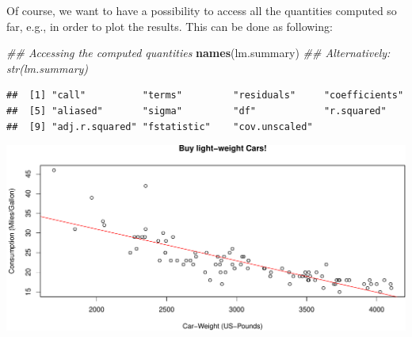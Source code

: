 \documentclass[]{book}
\newenvironment{Shaded}{\begin{snugshade}}{\end{snugshade}}
\newcommand{\CommentTok}[1]{\textcolor[rgb]{0.56,0.35,0.01}{\textit{#1}}}
\newcommand{\DataTypeTok}[1]{\textcolor[rgb]{0.13,0.29,0.53}{#1}}
\newcommand{\DecValTok}[1]{\textcolor[rgb]{0.00,0.00,0.81}{#1}}
\newcommand{\KeywordTok}[1]{\textcolor[rgb]{0.13,0.29,0.53}{\textbf{#1}}}
\newcommand{\NormalTok}[1]{#1}
\newcommand{\OperatorTok}[1]{\textcolor[rgb]{0.81,0.36,0.00}{\textbf{#1}}}
\newcommand{\StringTok}[1]{\textcolor[rgb]{0.31,0.60,0.02}{#1}}
\theoremstyle{definition}
\theoremstyle{definition}
\theoremstyle{definition}
\theoremstyle{remark}
\begin{document}
Of course, we want to have a possibility to access all the quantities computed so far, e.g., in order to plot the results. This can be done as following:

\begin{Shaded}
\begin{Highlighting}[]
\CommentTok{## Accessing the computed quantities}
\KeywordTok{names}\NormalTok{(lm.summary) }\CommentTok{## Alternatively: str(lm.summary)}
\end{Highlighting}
\end{Shaded}

\begin{verbatim}
##  [1] "call"          "terms"         "residuals"     "coefficients" 
##  [5] "aliased"       "sigma"         "df"            "r.squared"    
##  [9] "adj.r.squared" "fstatistic"    "cov.unscaled"
\end{verbatim}

\begin{Shaded}
\end{Shaded}

\begin{center}\includegraphics[width=\textwidth]{01-Introduction-to-R_files/figure-latex/unnamed-chunk-23-1} \end{center}
\end{document}
